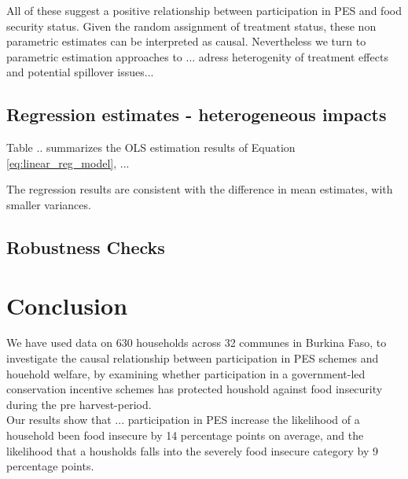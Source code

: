\documentclass[preprint,12pt]{elsarticle}
\begin{document}
All of these suggest a positive relationship between participation in PES and food security status. Given the random assignment of treatment status, these non parametric estimates can be interpreted as causal. Nevertheless we turn to parametric estimation approaches to ... adress heterogenity of treatment effects and potential spillover issues... \\


\newpage
\subsection{Regression estimates - heterogeneous impacts}
 
Table .. summarizes the OLS estimation results of Equation \ref{eq:linear_reg_model}, ...

The regression results are consistent with the difference in mean estimates, with smaller variances.


\newpage
\subsection{Robustness Checks}


%		



\clearpage
\newpage
\section{Conclusion}

We have used data on 630 households across 32 communes in Burkina Faso, to investigate the causal relationship between participation in PES schemes and 
houehold welfare, by examining whether participation in a government-led conservation incentive schemes has protected houshold against food insecurity during the pre harvest-period.  \\

Our results show that ... participation in PES increase the likelihood of a household been food insecure by 14 percentage points on average, and the likelihood that a housholds falls into the severely food insecure category by 9 percentage points.  \\
\end{document}
